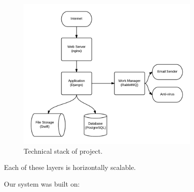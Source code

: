 \documentclass[12pt,a4paper,twosided]{article}
\begin{document}
\begin{figure}[h!]
  \centering
  \includegraphics[width=0.8\textwidth]{./tech-overview.png}
  \caption{Technical stack of project.}
  \label{fig:solution-stack}
\end{figure}

Each of these layers is horizontally scalable.

Our system was built on:
\end{document}
